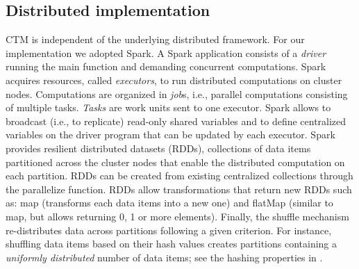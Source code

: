 \documentclass[preprint,12pt,authoryear]{elsarticle} %
\renewcommand{\sf}[1]{\textsf{\textup{#1}}}
\begin{document}
\subsection{Distributed implementation}
CTM is independent of the underlying distributed framework.
For our implementation we adopted Spark.
A Spark application consists of a \textit{driver} running the main function and demanding concurrent computations.
Spark acquires resources, called \textit{executors}, to run distributed computations on cluster nodes.
Computations are organized in  \textit{job}s, i.e., parallel computations consisting of multiple tasks.
\textit{Tasks} are work units sent to one executor.
Spark allows to \sf{broadcast} (i.e., to replicate) read-only shared variables and to define centralized variables on the driver program that can be updated by each executor.
Spark provides resilient distributed datasets (RDDs), collections of data items partitioned across the cluster nodes that enable the distributed computation on each partition.
RDDs can be created from existing centralized collections through the \sf{parallelize} function.
RDDs allow transformations that return new RDDs such as: \sf{map} (transforms each data items into a new one) and \sf{flatMap} (similar to \sf{map}, but allows returning 0, 1 or more elements).
Finally, the \sf{shuffle} mechanism re-distributes data across partitions following a given criterion.
For instance, shuffling data items based on their hash values
creates partitions containing a \textit{uniformly distributed} number of data items; see the hashing properties in \cite{menezes2018handbook}.
\end{document}

